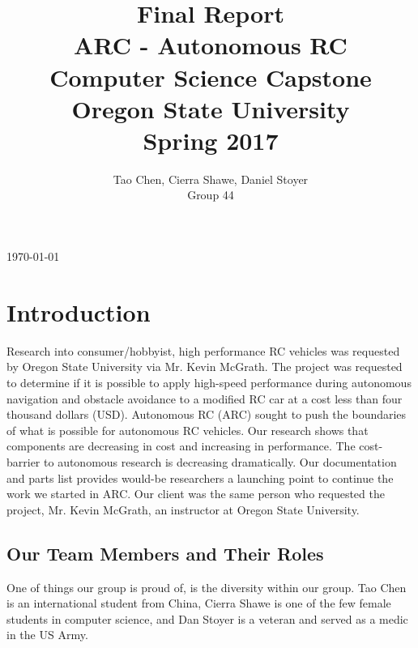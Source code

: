 \documentclass[compsoc,draftclsnofoot,onecolumn,10pt]{IEEEtran}
\date{}
\begin{document}
\begin{titlepage}
	\title{
	Final Report\\
	ARC - Autonomous RC	\\
	\Large 
	Computer Science Capstone \\
	Oregon State University\\
	Spring 2017
	}
    \author{Tao Chen, Cierra Shawe, Daniel Stoyer\\ Group 44}
	\maketitle
	\begin{center}
		\today
	\end{center}

	\thispagestyle{empty} %

\end{titlepage}

\tableofcontents

\clearpage

\section{Introduction}
Research into consumer/hobbyist, high performance RC vehicles was requested by Oregon State University via Mr. Kevin McGrath. 
The project was requested to determine if it is possible to apply high-speed performance during autonomous navigation and obstacle avoidance to a modified RC car at a cost less than four thousand dollars (USD). 
Autonomous RC (ARC) sought to push the boundaries of what is possible for autonomous RC vehicles. 
Our research shows that components are decreasing in cost and increasing in performance. 
The cost-barrier to autonomous research is decreasing dramatically. 
Our documentation and parts list provides would-be researchers a launching point to continue the work we started in ARC. 
Our client was the same person who requested the project, Mr. Kevin McGrath, an instructor at Oregon State University. 

\subsection{Our Team Members and Their Roles}
One of things our group is proud of, is the diversity within our group. Tao Chen is an international student from China, Cierra Shawe is one of the few female students in computer science, and Dan Stoyer is a veteran and served as a medic in the US Army. 
\end{document}
